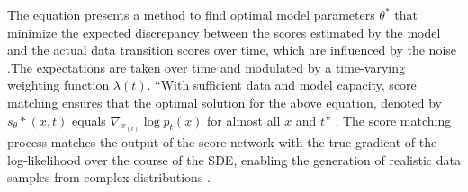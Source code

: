 \citep{song2020score} The equation presents a method to find optimal model parameters \( \theta^* \) that minimize the expected discrepancy between the scores estimated by the model and the actual data transition scores over time, which are influenced by the noise \citep{song2020score}.The expectations are taken over time and modulated by a time-varying weighting function \( \lambda(t) \). ``With sufficient data and model capacity, score matching ensures that the optimal solution for the above equation, denoted by \(s_\theta*(x, t)\) equals \(\nabla_{x_(t)} \log p_{t}(x)\) for almost all \( x \) and \( t \)'' \citep{song2020score}. The score matching process matches the output of the score network with the true gradient of the log-likelihood over the course of the SDE, enabling the generation of realistic data samples from complex distributions \citep{yangdiffusionSummary}.


